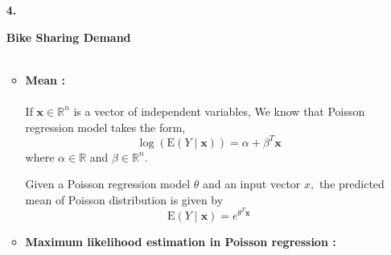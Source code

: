 \documentclass[english,a4paper,12pt]{article}
\begin{document}
\begin{enumerate}
    
\newpage

\item[\textbf{4.}]  \begin{center}
       \large{\textbf{Bike Sharing Demand}}\\~\\
   \end{center}
   \begin{itemize}
        \item \textbf{Mean :}\\\\
       If $\mathbf{x} \in \mathbb{R}^{n}$ is a vector of independent variables, We know that Poisson regression model takes the form,
$$
\log (\mathrm{E}(Y \mid \mathbf{x}))=\alpha+\beta^{T} \mathbf{x}
$$
where $\alpha \in \mathbb{R}$ and $\beta \in \mathbb{R}^{n}$.

Given a Poisson regression model $\theta$ and an input vector $x,$ the predicted mean of Poisson distribution is given by
$$
\mathrm{E}(Y \mid \mathbf{x})=e^{\theta^{T} \mathbf{x}}
$$  
\item \textbf{Maximum likelihood estimation in Poisson regression :}\\\\


\end{itemize}
\end{enumerate}
\end{document}
